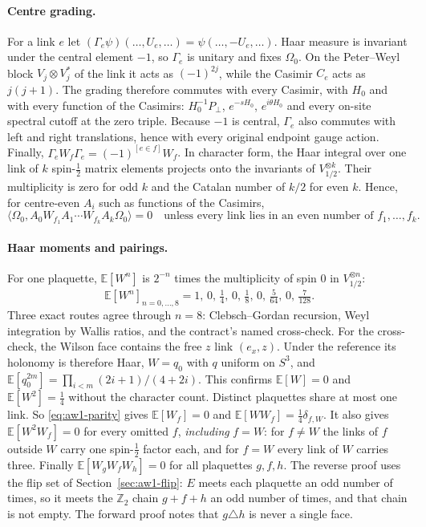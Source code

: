 \paragraph{Centre grading.}
For a link $e$ let $(\Gamma_e\psi)(\ldots,U_e,\ldots)=\psi(\ldots,-U_e,\ldots)$.
Haar measure is invariant under the central element $-1$, so $\Gamma_e$ is
unitary and fixes $\Omega_0$. On the Peter--Weyl block $V_j\otimes V_j^*$ of
the link it acts as $(-1)^{2j}$, while the Casimir $C_e$ acts as $j(j+1)$. The
grading therefore commutes with every Casimir, with $H_0$ and with every
function of the Casimirs: $H_0^{-1}P_\perp$, $e^{-sH_0}$, $e^{i\theta H_0}$
and every on-site spectral cutoff at the zero triple. Because $-1$ is central,
$\Gamma_e$ also commutes with left and right translations, hence with every
original endpoint gauge action. Finally,
$\Gamma_eW_f\Gamma_e=(-1)^{[e\in f]}W_f$. In character form, the Haar integral
over one link of $k$ spin-$\tfrac12$ matrix elements projects onto the
invariants of $V_{1/2}^{\otimes k}$. Their multiplicity is zero for odd $k$
and the Catalan number of $k/2$ for even $k$. Hence, for centre-even $A_i$
such as functions of the Casimirs,
\begin{equation}
 \langle\Omega_0,A_0W_{f_1}A_1\cdots W_{f_k}A_k\Omega_0\rangle=0
 \quad\text{unless every link lies in an even number of }f_1,\dots,f_k .
 \label{eq:aw1-parity}
\end{equation}

\paragraph{Haar moments and pairings.}
For one plaquette, $\mathbb E[W^n]$ is $2^{-n}$ times the multiplicity of spin
$0$ in $V_{1/2}^{\otimes n}$:
\begin{equation}
 \mathbb E[W^n]_{n=0,\dots,8}=1,\,0,\,\tfrac14,\,0,\,\tfrac18,\,0,\,\tfrac5{64},\,0,\,\tfrac7{128}.
 \label{eq:aw1-moments}
\end{equation}
Three exact routes agree through $n=8$: Clebsch--Gordan recursion, Weyl
integration by Wallis ratios, and the contract's named cross-check. For the
cross-check, the Wilson face contains the free $z$ link $(e_x,z)$. Under the
reference its holonomy is therefore Haar, $W=q_0$ with $q$ uniform on $S^3$,
and $\mathbb E[q_0^{2m}]=\prod_{i<m}(2i+1)/(4+2i)$. This confirms
$\mathbb E[W]=0$ and $\mathbb E[W^2]=\tfrac14$ without the character count.
Distinct plaquettes share at most one link. So \eqref{eq:aw1-parity} gives
$\mathbb E[W_f]=0$ and $\mathbb E[WW_f]=\tfrac14\delta_{f,W}$. It also gives
$\mathbb E[W^2W_f]=0$ for every omitted $f$, \emph{including} $f=W$: for
$f\ne W$ the links of $f$ outside $W$ carry one spin-$\tfrac12$ factor each,
and for $f=W$ every link of $W$ carries three. Finally
$\mathbb E[W_gW_fW_h]=0$ for all plaquettes $g,f,h$. The reverse proof uses
the flip set of Section~\ref{sec:aw1-flip}: $E$ meets each plaquette an odd
number of times, so it meets the $\mathbb Z_2$ chain $g+f+h$ an odd number of
times, and that chain is not empty. The forward proof notes that $g\triangle h$
is never a single face.

